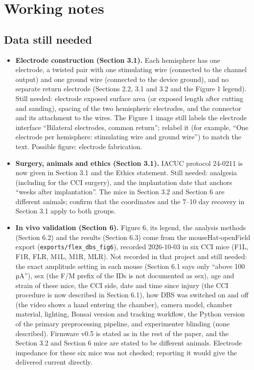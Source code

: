 \section{Working notes}\label{working-notes}

\subsection{Data still needed}\label{notes-data}

\begin{itemize}
\item \textbf{Electrode construction (Section 3.1).} Each hemisphere has one electrode, a twisted pair with one stimulating wire (connected to the channel output) and one ground wire (connected to the device ground), and no separate return electrode (Sections 2.2, 3.1 and 3.2 and the Figure 1 legend). Still needed: electrode exposed surface area (or exposed length after cutting and sanding), spacing of the two hemispheric electrodes, and the connector and its attachment to the wires. The Figure 1 image still labels the electrode interface ``Bilateral electrodes, common return''; relabel it (for example, ``One electrode per hemisphere: stimulating wire and ground wire'') to match the text. Possible figure: electrode fabrication.
\item \textbf{Surgery, animals and ethics (Section 3.1).} IACUC protocol 24-0211 is now given in Section 3.1 and the Ethics statement. Still needed: analgesia (including for the CCI surgery), and the implantation date that anchors ``weeks after implantation''. The mice in Section 3.2 and Section 6 are different animals; confirm that the coordinates and the 7--10 day recovery in Section 3.1 apply to both groups.
\item \textbf{In vivo validation (Section 6).} Figure 6, its legend, the analysis methods (Section 6.2) and the results (Section 6.3) come from the mouseHat-openField export (\texttt{exports/flex\_dbs\_fig6}), recorded 2026-10-03 in six CCI mice (F1L, F1R, FLR, M1L, M1R, MLR). Not recorded in that project and still needed: the exact amplitude setting in each mouse (Section 6.1 says only ``above 100 µA''), sex (the F/M prefix of the IDs is not documented as sex), age and strain of these mice, the CCI side, date and time since injury (the CCI procedure is now described in Section 6.1), how DBS was switched on and off (the video shows a hand entering the chamber), camera model, chamber material, lighting, Bonsai version and tracking workflow, the Python version of the primary preprocessing pipeline, and experimenter blinding (none described). Firmware v0.5 is stated as in the rest of the paper, and the Section 3.2 and Section 6 mice are stated to be different animals. Electrode impedance for these six mice was not checked; reporting it would give the delivered current directly.

\end{itemize}
